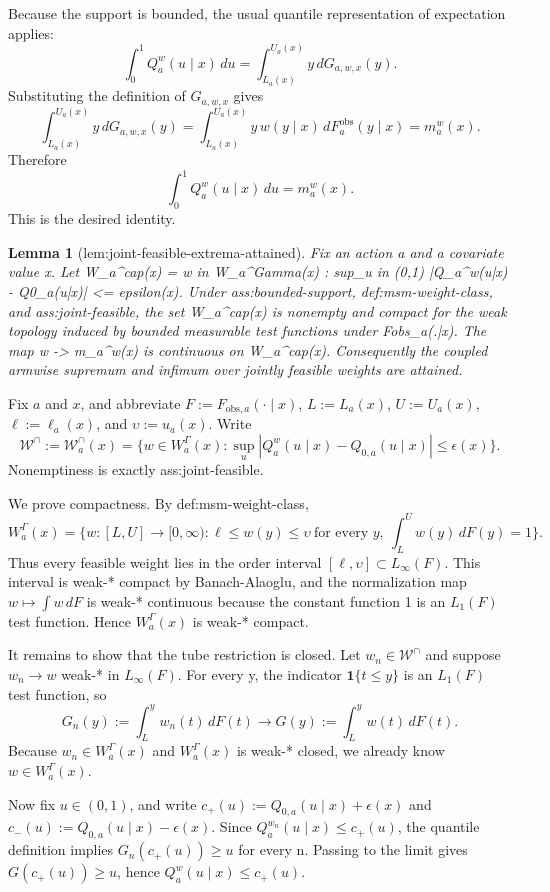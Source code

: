 \documentclass{article}
\newtheorem{lemma}{Lemma}
\begin{document}
Because the support is bounded, the usual quantile representation of expectation applies:
\[
\int_0^1 Q_a^w(u\mid x)\,du
= \int_{L_a(x)}^{U_a(x)} y\, dG_{a,w,x}(y).
\]
Substituting the definition of \(G_{a,w,x}\) gives
\[
\int_{L_a(x)}^{U_a(x)} y\, dG_{a,w,x}(y)
= \int_{L_a(x)}^{U_a(x)} y\, w(y\mid x)\, dF^{\mathrm{obs}}_a(y\mid x)
= m_a^w(x).
\]
Therefore
\[
\int_0^1 Q_a^w(u\mid x)\,du = m_a^w(x).
\]
This is the desired identity.

\begin{lemma}[lem:joint-feasible-extrema-attained]\label{lem:joint-feasible-extrema-attained}
Fix an action a and a covariate value x. Let W_a^cap(x) = {w in W_a^Gamma(x) : sup_{u in (0,1)} |Q_a^w(u|x) - Q0_a(u|x)| <= epsilon(x)}. Under ass:bounded-support, def:msm-weight-class, and ass:joint-feasible, the set W_a^cap(x) is nonempty and compact for the weak topology induced by bounded measurable test functions under Fobs_a(.|x). The map w -> m_a^w(x) is continuous on W_a^cap(x). Consequently the coupled armwise supremum and infimum over jointly feasible weights are attained.
\end{lemma}
Fix \(a\) and \(x\), and abbreviate \(F:=F_{\mathrm{obs},a}(\cdot\mid x)\), \(L:=L_a(x)\), \(U:=U_a(x)\), \(\ell:=\ell_a(x)\), and \(\upsilon:=u_a(x)\). Write
\[
\mathcal W^{\cap}:=\mathcal W_a^{\cap}(x)=\Big\{w\in W_a^{\Gamma}(x):\sup_u |Q_a^w(u\mid x)-Q_{0,a}(u\mid x)|\le \epsilon(x)\Big\}.
\]
Nonemptiness is exactly ass:joint-feasible.

We prove compactness. By def:msm-weight-class,
\[
W_a^{\Gamma}(x)=\Big\{w:[L,U]\to[0,\infty): \ell\le w(y)\le \upsilon\ \text{for every }y,\ \int_L^U w(y)\,dF(y)=1\Big\}.
\]
Thus every feasible weight lies in the order interval \([\ell,\upsilon]\subset L_{\infty}(F)\). This interval is weak-* compact by Banach-Alaoglu, and the normalization map \(w\mapsto \int w\,dF\) is weak-* continuous because the constant function 1 is an \(L_1(F)\) test function. Hence \(W_a^{\Gamma}(x)\) is weak-* compact.

It remains to show that the tube restriction is closed. Let \(w_n\in\mathcal W^{\cap}\) and suppose \(w_n\to w\) weak-* in \(L_{\infty}(F)\). For every y, the indicator \(\mathbf 1\{t\le y\}\) is an \(L_1(F)\) test function, so
\[
G_n(y):=\int_L^y w_n(t)\,dF(t) \longrightarrow G(y):=\int_L^y w(t)\,dF(t).
\]
Because \(w_n\in W_a^{\Gamma}(x)\) and \(W_a^{\Gamma}(x)\) is weak-* closed, we already know \(w\in W_a^{\Gamma}(x)\).

Now fix \(u\in(0,1)\), and write \(c_+(u):=Q_{0,a}(u\mid x)+\epsilon(x)\) and \(c_-(u):=Q_{0,a}(u\mid x)-\epsilon(x)\). Since \(Q_a^{w_n}(u\mid x)\le c_+(u)\), the quantile definition implies \(G_n(c_+(u))\ge u\) for every n. Passing to the limit gives \(G(c_+(u))\ge u\), hence \(Q_a^w(u\mid x)\le c_+(u)\).
\end{document}

